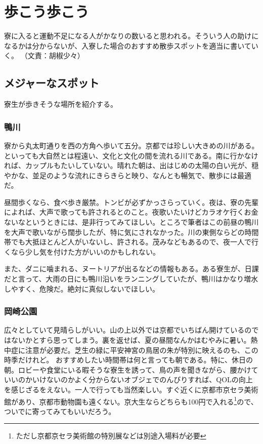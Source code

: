 

\section{歩こう歩こう}

寮に入ると運動不足になる人がかなりの数いると思われる。そういう人の助けになるかは分からないが、入寮した場合のおすすめ散歩スポットを適当に書いていく。 \hfill （文責：胡椒少々）
	

\begin{multicols}{2}

\subsection{メジャーなスポット}
\noindent 寮生が歩きそうな場所を紹介する。

\subsubsection{鴨川}

\noindent
\scalebox{0.88}{朝★★★★★昼★★★☆☆夜★★★★☆危険度★★☆☆☆}
\baselineskip
寮から丸太町通りを西の方角へ歩いて五分。京都では珍しい大きめの川がある。といっても大自然とは程遠い、文化と文化の間を流れる川である。南に行かなければ、カップルもたいしていない。晴れた朝は、出はじめの太陽の白い光が、穏やかな、並足のような流れにきらきらと映り、なんとも暢気で、散歩には最適だ。

昼間歩くなら、食べ歩き厳禁。トンビが必ずかっさらっていく。夜は、寮の先輩によれば、大声で歌っても許されるとのこと。夜歌いたいけどカラオケ行くお金ないなというときには、是非行ってみてほしい。ところで筆者はこの前昼の鴨川を大声で歌いながら闊歩したが、特に気にされなかった。川の東側ならどの時間帯でも大抵ほとんど人がいないし、許される。茂みなどもあるので、夜一人で行くなら少し気を付けた方がいいのかもしれない。

また、ダニに噛まれる、ヌートリアが出るなどの情報もある。ある寮生が、日課だと言って、大雨の日にも鴨川沿いをランニングしていたが、鴨川はかなり増水しやすく、危険だ。絶対に真似しないでほしい。

\subsubsection{岡崎公園}
 
\noindent
\scalebox{0.88}{朝★★★★★昼★★★★☆夜★★★★☆危険度★★☆☆☆}
\baselineskip
広々としていて見晴らしがいい。山の上以外では京都でいちばん開けているのではないかとすら思ってしまう。裏を返せば、夏の昼間なんかはむやみに暑い。熱中症に注意が必要だ。芝生の緑に平安神宮の鳥居の朱が特別に映えるのも、この時季だけれど。 おすすめしたい時間帯は何と言っても朝である。特に、休日の朝。ロビーや食堂にいる暇そうな寮生を誘って、鳥の声を聞きながら、腰かけていいのかいけないのかよく分からないオブジェでのんびりすれば、QOLの向上を感じざるをえない。一人で行っても当然楽しい。すぐ近くに京都市京セラ美術館があり、京都市動物園も遠くない。京大生ならどちらも100円で入れる\footnote{ただし京都京セラ美術館の特別展などは別途入場料が必要}ので、ついでに寄ってみてもいいだろう。


\end{multicols}

